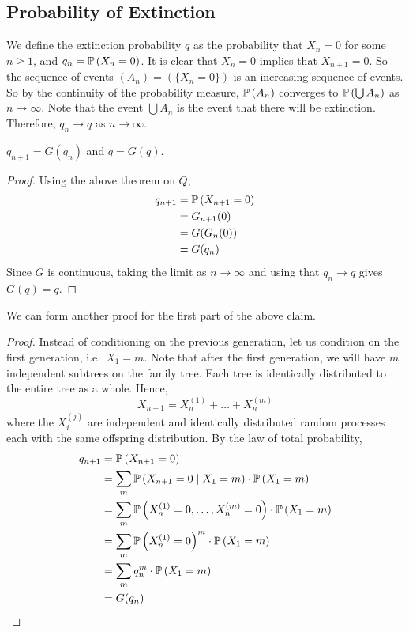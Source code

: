 \subsection{Probability of Extinction}
We define the extinction probability \(q\) as the probability that \(X_n = 0\) for some \(n \geq 1\), and \(q_n = \mathbb{P}\left({X_n = 0}\right)\).
It is clear that \(X_n = 0\) implies that \(X_{n+1} = 0\).
So the sequence of events \((A_n) = (\{ X_n = 0 \})\) is an increasing sequence of events.
So by the continuity of the probability measure, \(\mathbb{P}\left({A_n}\right)\) converges to \(\mathbb{P}\left({\bigcup A_n}\right)\) as \(n \to \infty\).
Note that the event \(\bigcup A_n\) is the event that there will be extinction.
Therefore, \(q_n \to q\) as \(n \to \infty\).
\begin{claim}
	\(q_{n+1} = G(q_n)\) and \(q = G(q)\).
\end{claim}
\begin{proof}
	Using the above theorem on \(Q\),
	\begin{align*}
		q_{n+1} & = \mathbb{P}\left({X_{n+1} = 0}\right) \\
		        & = G_{n+1}(0)         \\
		        & = G(G_n(0))          \\
		        & = G(q_n)
	\end{align*}
	Since \(G\) is continuous, taking the limit as \(n \to \infty\) and using that \(q_n \to q\) gives \(G(q) = q\).
\end{proof}
\noindent We can form another proof for the first part of the above claim.
\begin{proof}
	Instead of conditioning on the previous generation, let us condition on the first generation, i.e.\ \(X_1 = m\).
	Note that after the first generation, we will have \(m\) independent subtrees on the family tree.
	Each tree is identically distributed to the entire tree as a whole.
	Hence,
	\[
		X_{n+1} = X_n^{(1)} + \dots + X_n^{(m)}
	\]
	where the \(X_i^{(j)}\) are independent and identically distributed random processes each with the same offspring distribution.
	By the law of total probability,
	\begin{align*}
		q_{n+1} & = \mathbb{P}\left({X_{n+1} = 0}\right)                                                     \\
		        & = \sum_m \mathbb{P}\left({X_{n+1} = 0 \mid X_1 = m}\right) \cdot \mathbb{P}\left({X_1 = m}\right)            \\
		        & = \sum_m \mathbb{P}\left({X_n^{(1)} = 0, \dots, X_n^{(m)} = 0}\right) \cdot \mathbb{P}\left({X_1 = m}\right) \\
		        & = \sum_m \mathbb{P}\left({X_n^{(1)} = 0}\right)^m \cdot \mathbb{P}\left({X_1 = m}\right)                     \\
		        & = \sum_m q_n^m \cdot \mathbb{P}\left({X_1 = m}\right)                                      \\
		        & = G(q_n)
	\end{align*}
\end{proof}
